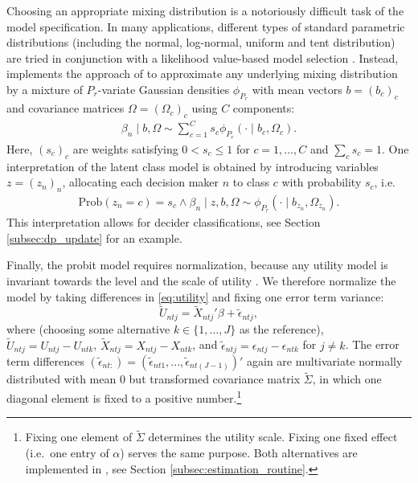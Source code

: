 \documentclass[article,shortnames]{jss}
\begin{document}
Choosing an appropriate mixing distribution is a notoriously difficult task of the model specification. In many applications, different types of standard parametric distributions (including the normal, log-normal, uniform and tent distribution) are tried in conjunction with a likelihood value-based model selection \citep[pp.\ 136 ff.\ ]{Train:2009}. Instead,  implements the approach of \cite{Oelschlaeger:2020} to approximate any underlying mixing distribution by a mixture of $P_r$-variate Gaussian densities $\phi_{P_r}$ with mean vectors $b=(b_c)_{c}$ and covariance matrices $\Omega=(\Omega_c)_{c}$ using $C$ components:
\begin{align*}
\beta_n\mid b,\Omega \sim \sum_{c=1}^{C} s_c \phi_{P_r} (\cdot \mid b_c,\Omega_c).
\end{align*}
Here, $(s_c)_{c}$ are weights satisfying $0 < s_c\leq 1$ for $c=1,\dots,C$ and $\sum_c s_c=1$. One interpretation of the latent class model is obtained by introducing variables $z=(z_n)_n$, allocating each decision maker $n$ to class $c$ with probability $s_c$, i.e.\
\begin{align*}
\text{Prob}(z_n=c)=s_c \land \beta_n \mid z,b,\Omega \sim \phi_{P_r}(\cdot \mid b_{z_n},\Omega_{z_n}).
\end{align*}
This interpretation allows for decider classifications, see Section \ref{subsec:dp_update} for an example.

Finally, the probit model requires normalization, because any utility model is invariant towards the level and the scale of utility \citep[Ch.\ 2]{Train:2009}. We therefore normalize the model by taking differences in \eqref{eq:utility} and fixing one error term variance:
\begin{equation}
\label{eq:utility_diff}
\tilde{U}_{ntj} = \tilde{X}_{ntj}' \beta + \tilde{\epsilon}_{ntj},
\end{equation}
where (choosing some alternative $k \in \{1,\dots,J\}$ as the reference), $\tilde{U}_{ntj} = U_{ntj} - U_{ntk}$, $\tilde{X}_{ntj} = X_{ntj} - X_{ntk}$, and $\tilde{\epsilon}_{ntj} = \epsilon_{ntj} - \epsilon_{ntk}$ for $j\neq k$. The error term differences $(\tilde{\epsilon}_{nt:}) = (\tilde{\epsilon}_{nt1},...,\tilde{\epsilon}_{nt(J-1)})'$ again are multivariate normally distributed with mean 0 but transformed covariance matrix $\tilde{\Sigma}$, in which one diagonal element is fixed to a positive number.\footnote{Fixing one element of $\tilde{\Sigma}$ determines the utility scale. Fixing one fixed effect (i.e.\ one entry of $\alpha$) serves the same purpose. Both alternatives are implemented in , see Section \ref{subsec:estimation_routine}.}
\end{document}
